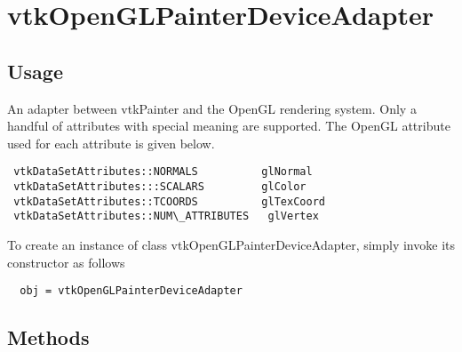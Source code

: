 \section{vtkOpenGLPainterDeviceAdapter}

\subsection{Usage}


 An adapter between vtkPainter and the OpenGL rendering system.  Only a
 handful of attributes with special meaning are supported.  The OpenGL
 attribute used for each attribute is given below.

 \begin{verbatim}
 vtkDataSetAttributes::NORMALS          glNormal
 vtkDataSetAttributes:::SCALARS         glColor
 vtkDataSetAttributes::TCOORDS          glTexCoord
 vtkDataSetAttributes::NUM\_ATTRIBUTES   glVertex
 \end{verbatim}


To create an instance of class vtkOpenGLPainterDeviceAdapter, simply
invoke its constructor as follows
\begin{verbatim}
  obj = vtkOpenGLPainterDeviceAdapter
\end{verbatim}
\subsection{Methods}


